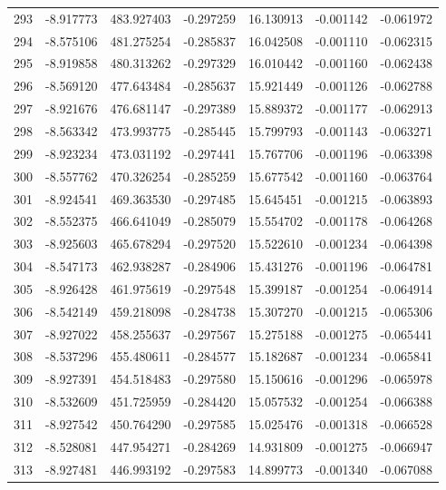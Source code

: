 \begin{tabular}{rrrrrrr}
 293 &  -8.917773 &  483.927403 & -0.297259 &   16.130913 &   -0.001142 & -0.061972 \\
 294 &  -8.575106 &  481.275254 & -0.285837 &   16.042508 &   -0.001110 & -0.062315 \\
 295 &  -8.919858 &  480.313262 & -0.297329 &   16.010442 &   -0.001160 & -0.062438 \\
 296 &  -8.569120 &  477.643484 & -0.285637 &   15.921449 &   -0.001126 & -0.062788 \\
 297 &  -8.921676 &  476.681147 & -0.297389 &   15.889372 &   -0.001177 & -0.062913 \\
 298 &  -8.563342 &  473.993775 & -0.285445 &   15.799793 &   -0.001143 & -0.063271 \\
 299 &  -8.923234 &  473.031192 & -0.297441 &   15.767706 &   -0.001196 & -0.063398 \\
 300 &  -8.557762 &  470.326254 & -0.285259 &   15.677542 &   -0.001160 & -0.063764 \\
 301 &  -8.924541 &  469.363530 & -0.297485 &   15.645451 &   -0.001215 & -0.063893 \\
 302 &  -8.552375 &  466.641049 & -0.285079 &   15.554702 &   -0.001178 & -0.064268 \\
 303 &  -8.925603 &  465.678294 & -0.297520 &   15.522610 &   -0.001234 & -0.064398 \\
 304 &  -8.547173 &  462.938287 & -0.284906 &   15.431276 &   -0.001196 & -0.064781 \\
 305 &  -8.926428 &  461.975619 & -0.297548 &   15.399187 &   -0.001254 & -0.064914 \\
 306 &  -8.542149 &  459.218098 & -0.284738 &   15.307270 &   -0.001215 & -0.065306 \\
 307 &  -8.927022 &  458.255637 & -0.297567 &   15.275188 &   -0.001275 & -0.065441 \\
 308 &  -8.537296 &  455.480611 & -0.284577 &   15.182687 &   -0.001234 & -0.065841 \\
 309 &  -8.927391 &  454.518483 & -0.297580 &   15.150616 &   -0.001296 & -0.065978 \\
 310 &  -8.532609 &  451.725959 & -0.284420 &   15.057532 &   -0.001254 & -0.066388 \\
 311 &  -8.927542 &  450.764290 & -0.297585 &   15.025476 &   -0.001318 & -0.066528 \\
 312 &  -8.528081 &  447.954271 & -0.284269 &   14.931809 &   -0.001275 & -0.066947 \\
 313 &  -8.927481 &  446.993192 & -0.297583 &   14.899773 &   -0.001340 & -0.067088 \\

\end{tabular}
